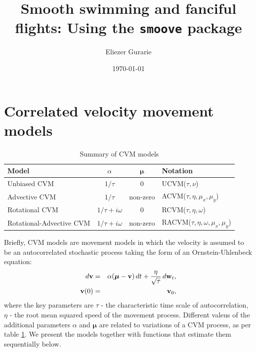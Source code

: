 \documentclass[10pt]{article}\usepackage[]{graphicx}\usepackage[]{color}
\title{Smooth swimming and fanciful flights:  Using the {\tt smoove} package}
\author{Eliezer Gurarie}
\date{\today}
\newcommand{\bmu}{\boldsymbol{\mu}}
\begin{document}
\maketitle 

\singlespace
\setcounter{tocdepth}{2}
\begin{spacing}{0.2} \tableofcontents \end{spacing} 
\onehalfspace

\pagebreak
{}  

\section{Correlated velocity movement models}


\begin{table}[h!]
\caption{\label{table.Summary} Summary of CVM models}
\begin{center}
\begin{tabular}{lccl}
Model & $\alpha$ & $\bmu$ & Notation\\
\hline
Unbiased CVM  & ${1 / \tau}$ & 0 & UCVM($\tau, \nu$)\\
Advective CVM & ${1 / \tau}$ & non-zero & ACVM($\tau, \eta, \mu_x, \mu_y$)\\
Rotational CVM & ${1 / \tau} + i\omega$ & 0 & RCVM($\tau, \eta, \omega$) \\
Rotational-Advective CVM & ${1 / \tau} + i\omega$ & non-zero & RACVM($\tau, \eta, \omega, \mu_x, \mu_y$) \end{tabular}
\end{center}
\end{table}



Briefly, CVM models are movement models in which the velocity is assumed to be an autocorrelated stochastic process taking the form of an Ornstein-Uhlenbeck equation:
	\begin{eqnarray}\label{eq.CVM}
		d{\bf v} &=& \alpha ({\bmu} - {\bf v}) \, dt + {\eta \over \sqrt{\tau}} \,d{\bf w}_t,\\
		{\bf v}(0) &=& {\bf v}_0, \nonumber
\end{eqnarray}
\noindent where the key parameters are $\tau$  - the characteristic time scale of autocorrelation, $\eta$ - the root mean squared speed of the movement process.  Different valeus of the additional parameters $\alpha$ and $\bmu$ are related to variations of a CVM process, as per table \ref{table.Summary}.  We present the models together with functions that estimate them sequentially below.  
\end{document}
